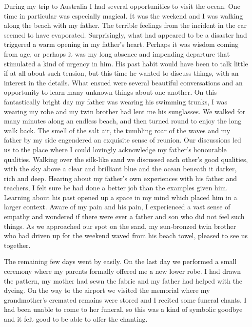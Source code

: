 During my trip to Australia I had several opportunities to visit the
ocean. One time in particular was especially magical. It was the weekend
and I was walking along the beach with my father. The terrible feelings
from the incident in the car seemed to have evaporated. Surprisingly, 
what had appeared to be a disaster had triggered a warm opening in my
father's heart. Perhaps it was wisdom coming from age, or perhaps it was
my long absence and impending departure that stimulated a kind of
urgency in him. His past habit would have been to talk little if at all
about such tension, but this time he wanted to discuss things, with an
interest in the details. What ensued were several beautiful
conversations and an opportunity to learn many unknown things about one
another. On this fantastically bright day my father was wearing his
swimming trunks, I was wearing my robe and my twin brother had lent me
his sunglasses. We walked for many minutes along an endless beach, and
then turned round to enjoy the long walk back. The smell of the salt
air, the tumbling roar of the waves and my father by my side engendered
an exquisite sense of reunion. Our discussions led us to the place where
I could lovingly acknowledge my father's honourable qualities. Walking
over the silk-like sand we discussed each other's good qualities, with
the sky above a clear and brilliant blue and the ocean beneath it
darker, rich and deep. Hearing about my father's own experiences with
his father and teachers, I felt sure he had done a better job than the
examples given him. Learning about his past opened up a space in my mind
which placed him in a larger context. Aware of my pain and his pain, I
experienced a vast sense of empathy and wondered if there were ever a
father and son who did not feel such things. As we approached our spot
on the sand, my sun-bronzed twin brother who had driven up for the
weekend waved from his beach towel, pleased to see us together. 

The remaining few days went by easily. On the last day we performed a
small ceremony where my parents formally offered me a new lower robe. I
had drawn the pattern, my mother had sewn the fabric and my father had
helped with the dyeing. On the way to the airport we visited the
memorial where my grandmother's cremated remains were stored and I
recited some funeral chants. I had been unable to come to her funeral, 
so this was a kind of symbolic goodbye and it felt good to be able to
offer the chanting. 

